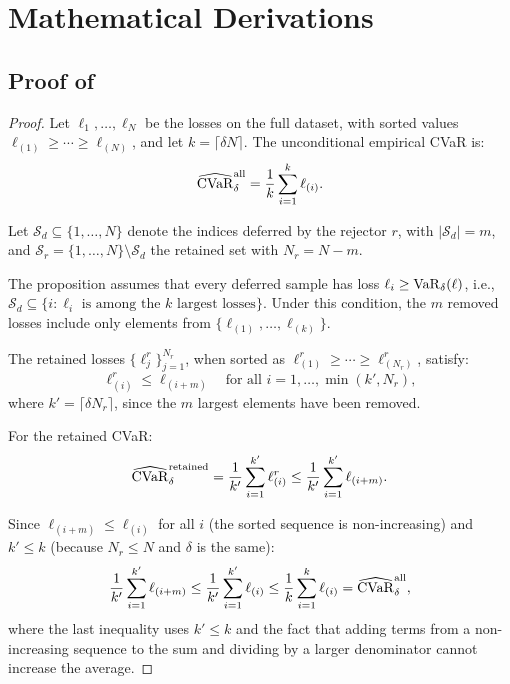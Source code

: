 \section{Mathematical Derivations}
\label{app:math}

\subsection{Proof of }

\begin{proof}
Let $\ell_1, \ldots, \ell_N$ be the losses on the full dataset, with sorted values $\ell_{(1)} \geq \cdots \geq \ell_{(N)}$, and let $k = \lceil \delta N \rceil$. The unconditional empirical CVaR is:
\[
\widehat{\mathrm{CVaR}}_\delta^{\text{all}} = \frac{1}{k} \sum_{i=1}^{k} \ell_{(i)}.
\]

Let $\mathcal{S}_d \subseteq \{1, \ldots, N\}$ denote the indices deferred by the rejector $r$, with $|\mathcal{S}_d| = m$, and $\mathcal{S}_r = \{1, \ldots, N\} \setminus \mathcal{S}_d$ the retained set with $N_r = N - m$.

The proposition assumes that every deferred sample has loss $\ell_i \geq \mathrm{VaR}_\delta(\ell)$, i.e., $\mathcal{S}_d \subseteq \{i : \ell_i \text{ is among the } k \text{ largest losses}\}$. Under this condition, the $m$ removed losses include only elements from $\{\ell_{(1)}, \ldots, \ell_{(k)}\}$.

The retained losses $\{\ell_j^r\}_{j=1}^{N_r}$, when sorted as $\ell^r_{(1)} \geq \cdots \geq \ell^r_{(N_r)}$, satisfy:
\[
\ell^r_{(i)} \leq \ell_{(i+m)} \quad \text{for all } i = 1, \ldots, \min(k', N_r),
\]
where $k' = \lceil \delta N_r \rceil$, since the $m$ largest elements have been removed.

For the retained CVaR:
\[
\widehat{\mathrm{CVaR}}_\delta^{\text{retained}} = \frac{1}{k'} \sum_{i=1}^{k'} \ell^r_{(i)} \leq \frac{1}{k'} \sum_{i=1}^{k'} \ell_{(i+m)}.
\]

Since $\ell_{(i+m)} \leq \ell_{(i)}$ for all $i$ (the sorted sequence is non-increasing) and $k' \leq k$ (because $N_r \leq N$ and $\delta$ is the same):
\[
\frac{1}{k'}\sum_{i=1}^{k'} \ell_{(i+m)} \leq \frac{1}{k'}\sum_{i=1}^{k'} \ell_{(i)} \leq \frac{1}{k}\sum_{i=1}^{k} \ell_{(i)} = \widehat{\mathrm{CVaR}}_\delta^{\text{all}},
\]
where the last inequality uses $k' \leq k$ and the fact that adding terms from a non-increasing sequence to the sum and dividing by a larger denominator cannot increase the average.
\end{proof}

